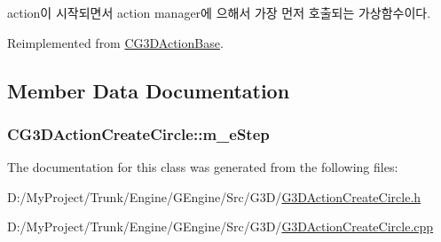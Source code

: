 \begin{DoxyItemize}
\item action이 시작되면서 action manager에 으해서 가장 먼저 호출되는 가상함수이다. 
\end{DoxyItemize}

Reimplemented from \hyperlink{class_c_g3_d_action_base_afaa3c0d456deadd08cad7e7ea4444a1e}{C\+G3\+D\+Action\+Base}.



\subsection{Member Data Documentation}
\hypertarget{class_c_g3_d_action_create_circle_ac73bf36bcfab0ce53dd010c195ec6d87}{}
\subsubsection[{m\+\_\+e\+Step}]{ C\+G3\+D\+Action\+Create\+Circle\+::m\+\_\+e\+Step\hspace{0.3cm}{\ttfamily [protected]}}\label{class_c_g3_d_action_create_circle_ac73bf36bcfab0ce53dd010c195ec6d87}


The documentation for this class was generated from the following files\+:\begin{DoxyCompactItemize}
\item 
D\+:/\+My\+Project/\+Trunk/\+Engine/\+G\+Engine/\+Src/\+G3\+D/\hyperlink{_g3_d_action_create_circle_8h}{G3\+D\+Action\+Create\+Circle.\+h}\item 
D\+:/\+My\+Project/\+Trunk/\+Engine/\+G\+Engine/\+Src/\+G3\+D/\hyperlink{_g3_d_action_create_circle_8cpp}{G3\+D\+Action\+Create\+Circle.\+cpp}\end{DoxyCompactItemize}
